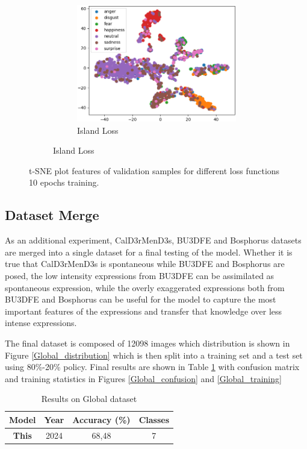 \begin{figure}[ht]
\begin{subfigure}{\textwidth}
\begin{subfigure}{0.32\textwidth}
            \includegraphics[width=\linewidth]{Images/Features/Island_5.png}
                \caption{Island Loss}
                \label{Island_5}
            \end{subfigure}
    \end{subfigure}
         \caption{t-SNE plot features of validation samples for different loss functions 10 epochs training.}
         \label{features_img}
\end{figure}


\subsection{Dataset Merge}
As an additional experiment, CalD3rMenD3s, BU3DFE and Bosphorus datasets are merged into a single dataset for a final testing of the model. Whether it is true that CalD3rMenD3s is spontaneous while BU3DFE and Bosphorus are posed, the low intensity expressions from BU3DFE can be assimilated as spontaneous expression, while the overly exaggerated expressions both from BU3DFE and Bosphorus can be useful for the model to capture the most important features of the expressions and transfer that knowledge over less intense expressions.

    The final dataset is composed of 12098 images which distribution is shown in Figure \ref{Global_distribution} which is then split into a training set and a test set using 80\%-20\% policy. 
    Final results are shown in Table \ref{Global_results} with confusion matrix and training statistics in Figures \ref{Global_confusion} and \ref{Global_training}
    
    \begin{table}[H]
        \centering
        \caption{Results on Global dataset}
        \label{Global_results}
        \begin{tabular}{cccc}
        \hline
        Model & Year &Accuracy (\%) & Classes\\
        \hline
        \textbf{This} & 2024 & 68,48 & 7 \\
        \hline
        \end{tabular}
    \end{table}

